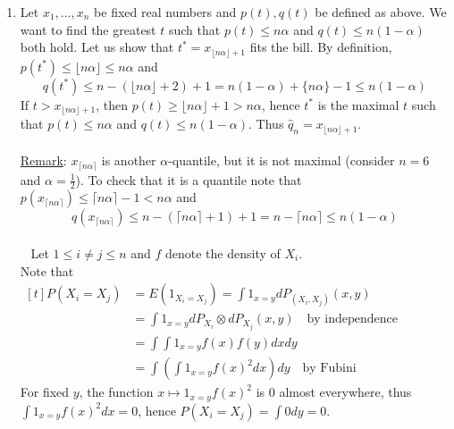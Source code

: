 \documentclass[a4paper,11pt]{article}
\begin{document}
\begin{enumerate}
  \item Let $x_1,\ldots,x_n$ be fixed real numbers and $p(t), q(t)$ be defined as above. We want to find the greatest $t$ such that $p(t)\leq n\alpha$ and $q(t)\leq n(1-\alpha)$ both hold. Let us show that $t^*=x_{\lfloor n\alpha \rfloor+1}$ fits the bill. By definition, $p(t^*)\leq\lfloor n\alpha \rfloor\leq n\alpha$ and $$q(t^*)\leq n-(\lfloor n\alpha\rfloor+2)+1 = n(1-\alpha)+\{n\alpha\}-1\leq n(1-\alpha)$$ 
  If $t>x_{\lfloor n\alpha \rfloor+1}$, then $p(t)\geq \lfloor n\alpha \rfloor+1 > n\alpha$, hence $t^*$ is the maximal $t$ such that $p(t)\leq n\alpha$ and $q(t)\leq n(1-\alpha)$. Thus $\hat q_n = x_{\lfloor n\alpha \rfloor+1}$.\\
  \\
  \underline{Remark}: $x_{\lceil n\alpha \rceil}$ is another $\alpha$-quantile, but it is not maximal (consider $n=6$ and $\alpha=\frac 12$). To check that it is a quantile note that $p(x_{\lceil n\alpha \rceil})\leq \lceil n\alpha \rceil -1 < n\alpha$ and $$q(x_{\lceil n\alpha \rceil})\leq n-(\lceil n\alpha \rceil+1)+1 = n-\lceil n\alpha \rceil \leq n(1-\alpha)$$ 
  \\ 
  Let $1\leq i\neq j \leq n$ and $f$ denote the density of $X_i$. \\Note that $\begin{aligned}[t]
    P(X_i=X_j) &= E(1_{X_i=X_j}) = \int 1_{x=y} dP_{(X_i,X_j)}(x,y)\\
    &=\int 1_{x=y} dP_{X_i}\otimes  dP_{X_j}(x,y) \quad \text{by independence}\\
    &=\int \int 1_{x=y}f(x)f(y)dx dy\\
    &=\int \left(\int 1_{x=y}f(x)^2dx\right) dy \quad \text{by Fubini}
  \end{aligned}$\\
  For fixed $y$, the function $x\mapsto 1_{x=y}f(x)^2$ is $0$ almost everywhere, thus $\int 1_{x=y}f(x)^2dx = 0$, hence $P(X_i=X_j) = \int 0 dy = 0$.


\end{enumerate}
\end{document}
